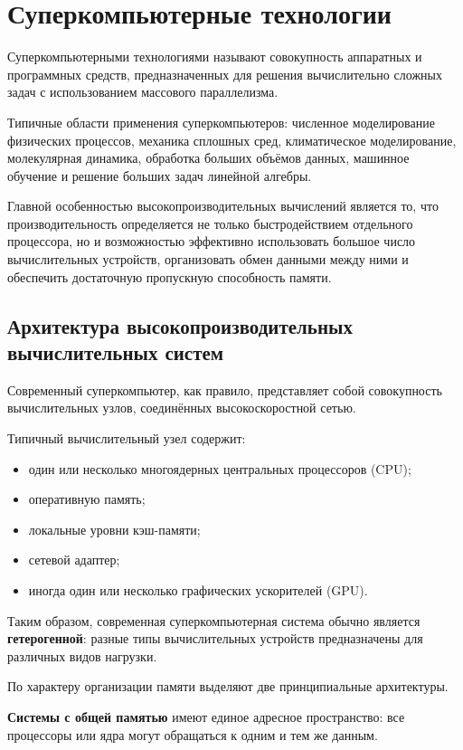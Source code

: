 \section{Суперкомпьютерные технологии}

Суперкомпьютерными технологиями называют совокупность аппаратных и программных
средств, предназначенных для решения вычислительно сложных задач с использованием
массового параллелизма.

Типичные области применения суперкомпьютеров:
численное моделирование физических процессов, механика сплошных сред,
климатическое моделирование, молекулярная динамика, обработка больших объёмов
данных, машинное обучение и решение больших задач линейной алгебры.

Главной особенностью высокопроизводительных вычислений является то, что
производительность определяется не только быстродействием отдельного процессора,
но и возможностью эффективно использовать большое число вычислительных устройств,
организовать обмен данными между ними и обеспечить достаточную пропускную
способность памяти.

\subsection{Архитектура высокопроизводительных вычислительных систем}

Современный суперкомпьютер, как правило, представляет собой совокупность
вычислительных узлов, соединённых высокоскоростной сетью.

Типичный вычислительный узел содержит:
\begin{itemize}
	\item один или несколько многоядерных центральных процессоров (CPU);
	\item оперативную память;
	\item локальные уровни кэш-памяти;
	\item сетевой адаптер;
	\item иногда один или несколько графических ускорителей (GPU).
\end{itemize}

Таким образом, современная суперкомпьютерная система обычно является
\textbf{гетерогенной}: разные типы вычислительных устройств предназначены
для различных видов нагрузки.

По характеру организации памяти выделяют две принципиальные архитектуры.

\textbf{Системы с общей памятью} имеют единое адресное пространство:
все процессоры или ядра могут обращаться к одним и тем же данным.

